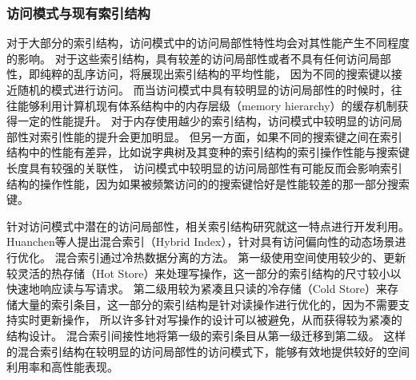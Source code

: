 \subsubsection{访问模式与现有索引结构}

对于大部分的索引结构，访问模式中的访问局部性特性均会对其性能产生不同程度的影响。
对于这些索引结构，具有较差的访问局部性或者不具有任何访问局部性，即纯粹的乱序访问，将展现出索引结构的平均性能，
因为不同的搜索键以接近随机的模式进行访问。
而当访问模式中具有较明显的访问局部性的时候时，往往能够利用计算机现有体系结构中的内存层级（memory hierarchy）的缓存机制获得一定的性能提升。
对于内存使用越少的索引结构，访问模式中较明显的访问局部性对索引性能的提升会更加明显。
但另一方面，如果不同的搜索键之间在索引结构中的性能有差异，比如说字典树及其变种的索引结构的索引操作性能与搜索键长度具有较强的关联性，
访问模式中较明显的访问局部性有可能反而会影响索引结构的操作性能，因为如果被频繁访问的的搜索键恰好是性能较差的那一部分搜索键。

针对访问模式中潜在的访问局部性，相关索引结构研究就这一特点进行开发利用。
Huanchen等人提出混合索引\cite{zhang2016reducing}（Hybrid Index），针对具有访问偏向性的动态场景进行优化。
混合索引通过冷热数据分离的方法。
第一级使用空间使用较少的、更新较灵活的热存储（Hot Store）来处理写操作，这一部分的索引结构的尺寸较小以快速地响应读与写请求。
第二级用较为紧凑且只读的冷存储（Cold Store）来存储大量的索引条目，这一部分的索引结构是针对读操作进行优化的，因为不需要支持实时更新操作，
所以许多针对写操作的设计可以被避免，从而获得较为紧凑的结构设计。
混合索引间接性地将第一级的索引条目从第一级迁移到第二级。
这样的混合索引结构在较明显的访问局部性的访问模式下，能够有效地提供较好的空间利用率和高性能表现。


